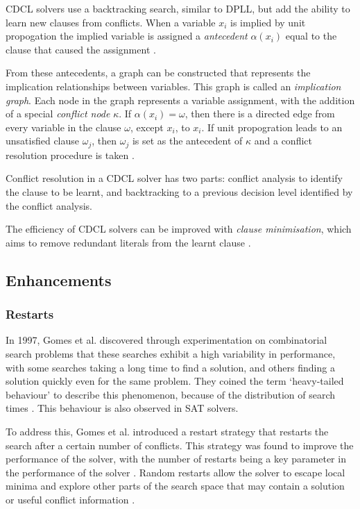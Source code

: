 \documentclass[conference]{IEEEtran}
\begin{document}
CDCL solvers use a backtracking search, similar to DPLL, but add the ability to learn new clauses from conflicts. When a variable \(x_i\) is implied by unit propogation the implied variable is assigned a \emph{antecedent} \(\alpha(x_i)\) equal to the clause that caused the assignment \cite{marques2008handbook}\cite{gelder2011generalized}.

From these antecedents, a graph can be constructed that represents the implication relationships between variables. This graph is called an \emph{implication graph}. Each node in the graph represents a variable assignment, with the addition of a special \emph{conflict node} \(\kappa\). If \(\alpha(x_i) = \omega\), then there is a directed edge from every variable in the clause \(\omega\), except \(x_i\), to \(x_i\). If unit propogration leads to an unsatisfied clause \(\omega_j\), then \(\omega_j\) is set as the antecedent of \(\kappa\) and a conflict resolution procedure is taken \cite{marques2008handbook}.

Conflict resolution in a CDCL solver has two parts: conflict analysis to identify the clause to be learnt, and backtracking to a previous decision level identified by the conflict analysis.

The efficiency of CDCL solvers can be improved with \emph{clause minimisation}, which aims to remove redundant literals from the learnt clause \cite{katebi2011empirical}.

\subsection{Enhancements}
\subsubsection{Restarts}
In 1997, Gomes et al. discovered through experimentation on combinatorial search problems that these searches exhibit a high variability in performance, with some searches taking a long time to find a solution, and others finding a solution quickly even for the same problem. They coined the term `heavy-tailed behaviour' to describe this phenomenon, because of the distribution of search times \cite{gomes1997heavy}. This behaviour is also observed in SAT solvers.

To address this, Gomes et al. introduced a restart strategy that restarts the search after a certain number of conflicts. This strategy was found to improve the performance of the solver, with the number of restarts being a key parameter in the performance of the solver \cite{gomes1997heavy}. Random restarts allow the solver to escape local minima and explore other parts of the search space that may contain a solution or useful conflict information \cite{katebi2011empirical} \cite{moskewicz2001chaff}.
\end{document}
